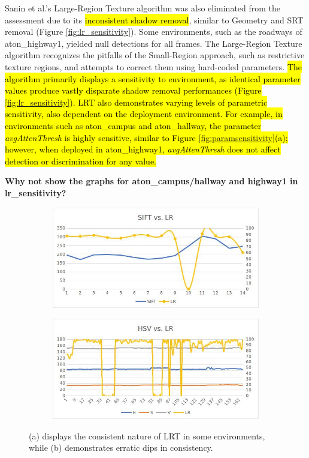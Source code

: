 \documentclass[12pt]{report}
\newcommand{\comment}[1]
           {\par {\bfseries \color{blue} #1 \par}}
\begin{document}
Sanin et al.'s Large-Region Texture algorithm was also eliminated from the assessment due to its \hl{inconsistent shadow removal}, similar to Geometry and SRT removal (Figure \ref{fig:lr_sensitivity}). Some environments, such as the roadways of aton\_highway1, yielded null detections for all frames. The Large-Region Texture algorithm recognizes the pitfalls of the Small-Region approach, such as restrictive texture regions, and attempts to correct them using hard-coded parameters. \hl{The algorithm primarily displays a sensitivity to environment, as identical parameter values produce vastly disparate shadow removal performances (Figure \ref{fig:lr_sensitivity}). LRT also demonstrates varying levels of parametric sensitivity, also dependent on the deployment environment. For example, in environments such as aton\_campus and aton\_hallway, the parameter \textit{avgAttenThresh} is highly sensitive, similar to Figure \ref{fig:paramsensitivity}(a); however, when deployed in aton\_highway1, \textit{avgAttenThresh} does not affect detection or discrimination for any value.}

\comment{Why not show the graphs for aton\_campus/hallway and highway1 in lr\_sensitivity?}

\begin{figure}
\centering
\begin{subfigure}{.8\linewidth}
  \centering
 \includegraphics[width=1\linewidth]{figures/lrt_sensitivity_2.jpg}
  \caption{}
\end{subfigure}
\hfill
\begin{subfigure}{.8\linewidth}
  \centering
 \includegraphics[width=1\linewidth]{figures/lrt_sensitivity_1.jpg}
  \caption{}
\end{subfigure}
\caption{(a) displays the consistent nature of LRT in some environments, while (b) demonstrates erratic dips in consistency.}
\label{fig:lrt_sensitivity}
\end{figure}
\end{document}
